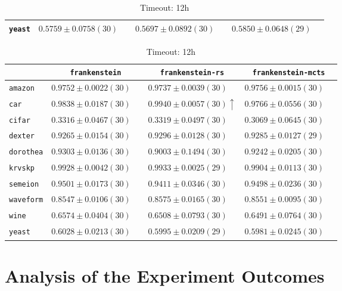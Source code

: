 \begin{table}[ht]
\begin{subtable}{\textwidth}
\begin{tabular}{l|ccc}
            \texttt{yeast} & $ 0.5759 \pm 0.0758 (30) \phantom{\downarrow}$ & $ 0.5697 \pm 0.0892 (30) \phantom{\downarrow}$ & $ 0.5850 \pm 0.0648 (29) \phantom{\downarrow}$\\
            \hline
        \end{tabular}
    \end{subtable}
    \par\bigskip
    \begin{subtable}{\textwidth}
        \centering
        \caption{Timeout: 12h}
        \begin{tabular}{l|ccc}
            & \texttt{frankenstein}  & \texttt{frankenstein-rs}  & \texttt{frankenstein-mcts} \\
            \hline
            \texttt{amazon} & $ 0.9752 \pm 0.0022 (30) \phantom{\downarrow}$ & $ 0.9737 \pm 0.0039 (30) \phantom{\downarrow}$ & $ 0.9756 \pm 0.0015 (30) \phantom{\downarrow}$\\
            \texttt{car} & $ 0.9838 \pm 0.0187 (30) \phantom{\downarrow}$ & $ 0.9940 \pm 0.0057 (30) \uparrow$ & $ 0.9766 \pm 0.0556 (30) \phantom{\downarrow}$\\
            \texttt{cifar} & $ 0.3316 \pm 0.0467 (30) \phantom{\downarrow}$ & $ 0.3319 \pm 0.0497 (30) \phantom{\downarrow}$ & $ 0.3069 \pm 0.0645 (30) \phantom{\downarrow}$\\
            \texttt{dexter} & $ 0.9265 \pm 0.0154 (30) \phantom{\downarrow}$ & $ 0.9296 \pm 0.0128 (30) \phantom{\downarrow}$ & $ 0.9285 \pm 0.0127 (29) \phantom{\downarrow}$\\
            \texttt{dorothea} & $ 0.9303 \pm 0.0136 (30) \phantom{\downarrow}$ & $ 0.9003 \pm 0.1494 (30) \phantom{\downarrow}$ & $ 0.9242 \pm 0.0205 (30) \phantom{\downarrow}$\\
            \texttt{krvskp} & $ 0.9928 \pm 0.0042 (30) \phantom{\downarrow}$ & $ 0.9933 \pm 0.0025 (29) \phantom{\downarrow}$ & $ 0.9904 \pm 0.0113 (30) \phantom{\downarrow}$\\
            \texttt{semeion} & $ 0.9501 \pm 0.0173 (30) \phantom{\downarrow}$ & $ 0.9411 \pm 0.0346 (30) \phantom{\downarrow}$ & $ 0.9498 \pm 0.0236 (30) \phantom{\downarrow}$\\
            \texttt{waveform} & $ 0.8547 \pm 0.0106 (30) \phantom{\downarrow}$ & $ 0.8575 \pm 0.0165 (30) \phantom{\downarrow}$ & $ 0.8551 \pm 0.0095 (30) \phantom{\downarrow}$\\
            \texttt{wine} & $ 0.6574 \pm 0.0404 (30) \phantom{\downarrow}$ & $ 0.6508 \pm 0.0793 (30) \phantom{\downarrow}$ & $ 0.6491 \pm 0.0764 (30) \phantom{\downarrow}$\\
            \texttt{yeast} & $ 0.6028 \pm 0.0213 (30) \phantom{\downarrow}$ & $ 0.5995 \pm 0.0209 (29) \phantom{\downarrow}$ & $ 0.5981 \pm 0.0245 (30) \phantom{\downarrow}$\\
            \hline
        \end{tabular}
    \end{subtable}
\end{table}

\section{Analysis of the Experiment Outcomes}
\label{sec:evaluation:analysis}

\Blindtext

